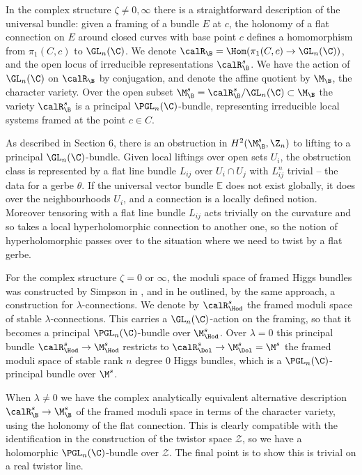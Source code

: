 In the  complex structure  $\zeta \ne 0,\infty$ there is a straightforward description of  the universal bundle: given a framing of a bundle $E$ at $c$, the holonomy of a flat connection on $E$ around closed curves with base point $c$ defines a homomorphism from $\pi_1(C,c)$ to $\GL_n(\C)$.   We denote $\calR_\B=\Hom(\pi_1(C,c)\to \GL_n(\C))$, and the open locus of irreducible representations $\calR^s_\B$. We have the action of $\GL_n(\C)$ on $\calR_\B$ by conjugation, and denote the affine quotient by $\M_\B$, the character variety. Over the open subset $\M^s_\B=\calR^s_\B/\GL_n(\C)\subset \M_\B$ the  variety $\calR^s_\B$ is a principal $\PGL_n(\C)$-bundle, representing irreducible local systems framed at the point $c\in C$.

As described in Section 6, there is an obstruction in  $H^2({\M^s_\B}, \Z_n)$ to lifting to a  principal $\GL_n(\C)$-bundle. Given local liftings over  open sets $U_i$, the obstruction class is represented by a flat line bundle $L_{ij}$ over $U_i\cap U_j$ with $L_{ij}^n$ trivial -- the data for a gerbe $\theta$. If the universal vector bundle ${\mathbb E}$  does not exist globally, it  does over the neighbourhoods $U_i$, and a connection is a locally defined notion. Moreover tensoring with a flat line bundle $L_{ij}$ acts trivially on the curvature and so takes a local hyperholomorphic connection to another one, so the notion of hyperholomorphic passes over to the situation where we need to twist by a flat gerbe.

For the complex structure $\zeta=0$ or $\infty$, the moduli space of framed Higgs bundles was constructed by Simpson in    \cite[Theorem 4.10]{simpson1}, and in \cite[Proposition 4.1]{simpson3} he  outlined, by the same approach, a construction for $\lambda$-connections. We denote by $\calR^s_\Hod$ the framed moduli space of stable $\lambda$-connections. This carries a $\GL_n(\C)$-action on the framing, so that it becomes a  principal $\PGL_n(\C)$-bundle over $\M^s_\Hod$.  Over $\lambda=0$ this principal bundle $\calR^s_\Hod\to \M^s_\Hod$ restricts to $\calR^s_\Dol\to \M_\Dol^s=\M^s$  the framed moduli space of stable rank $n$ degree $0$ Higgs bundles, which is a $\PGL_n(\C)$-principal bundle over $\M^s$.

When $\lambda\ne 0$ we have the complex analytically equivalent alternative description $\calR^s_\B\to \M^s_\B$ of the framed moduli space in terms of the character variety, using the holonomy of the flat connection. This  is clearly compatible with the identification in the construction of  the twistor space ${\mathcal Z}$,  so we have a holomorphic $\PGL_n(\C)$-bundle over ${\mathcal Z}$. The final point is to show this is trivial on a real twistor line.

